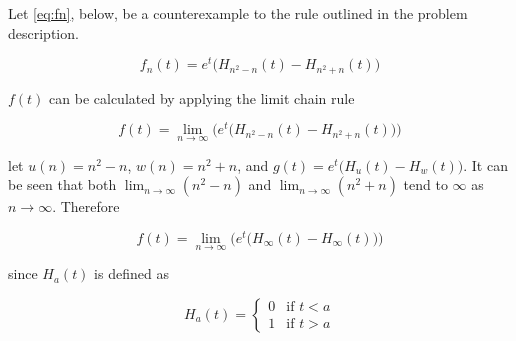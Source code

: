 \documentclass[a4paper,10pt,reqno]{amsart}
\numberwithin{equation}{section}
\newcommand{\lap}{\mathscr{L}}
\begin{document}





Let \eqref{eq:fn}, below, be a counterexample to the rule outlined in the problem description.

\begin{equation}\label{eq:fn}
     f_n(t) = e^t\big(H_{n^2 - n}(t) - H_{n^2 + n}(t)\big)
\end{equation}
\vspace{1pt}

$f(t)$ can be calculated by applying the limit chain rule

\begin{equation}
     f(t) = \lim_{n \to \infty} \bigg(e^t\big(H_{n^2 - n}(t) - H_{n^2 + n}(t)\big)\bigg)
\end{equation}
\vspace{1pt}

let $u(n) = n^2 - n$, $w(n) = n^2 + n$, and $g(t) = e^t\big(H_u(t) - H_w(t)\big)$. It can be seen that both $\lim_{n \to \infty} (n^2 - n)$ and $\lim_{n \to \infty} (n^2 + n)$ tend to  $\infty$ as $n \to \infty$. Therefore

\begin{equation}\label{eq:f_chainRule}
     f(t) = \lim_{n \to \infty} \bigg(e^t\big(H_{\infty}(t) - H_{\infty}(t)\big)\bigg)
\end{equation}
\vspace{1pt}

since $H_a(t)$ is defined as

\begin{equation}
    H_a(t) = 
     \begin{cases}
         0 & \text{if } t < a \\
         1 & \text{if } t > a
     \end{cases}
\end{equation}
\vspace{1pt}
\end{document}
